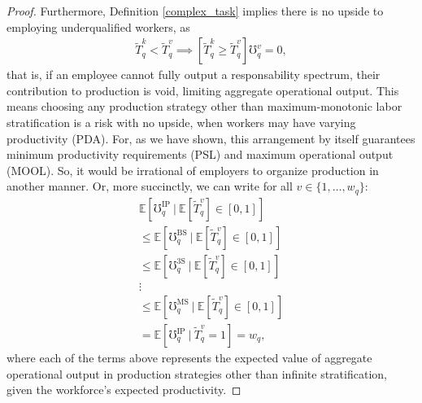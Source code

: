 \documentclass[hidelinks, nonatbib]{elsarticle}
\begin{document}
\begin{lemma}
\begin{proof}
        Furthermore, Definition \ref{complex_task} implies there is no upside to employing underqualified workers, as 
        \begin{gather}
            \tilde{T}_{q}^{k}
            <
            \tilde{T}_{q}^{v}
            \implies
            \left[
                \tilde{T}_{q}^{k}
                \geq
                \tilde{T}_{q}^{v}
            \right]
            \mho_{q}^{v}
            =
            0
            ,
        \end{gather}
        that is, if an employee cannot fully output a responsability spectrum, their contribution to production is void, limiting aggregate operational output. This means choosing any production strategy other than maximum-monotonic labor stratification is a risk with no upside, when workers may have varying productivity (PDA). For, as we have shown, this arrangement by itself guarantees minimum productivity requirements (PSL) and maximum operational output (MOOL). So, it would be irrational of employers to organize production in another manner. Or, more succinctly, we can write for all $v \in \{1, \dots, w_q\}$:
        \begin{gather}
            \mathbb{E}[
                \mho_{q}^{\text{IP}}
                \
                |
                \
                \mathbb{E}[
                    \tilde{T}_{q}^{v}
                ]
                \in [0,1]
            ]
            \\
            \leq
            \mathbb{E}[
                \mho_{q}^{\text{BS}}
                \
                |
                \
                \mathbb{E}[
                    \tilde{T}_{q}^{v}
                ]
                \in [0,1]
            ]
            \\
            \leq
            \mathbb{E}[
                \mho_{q}^{\text{3S}}
                \
                |
                \
                \mathbb{E}[
                    \tilde{T}_{q}^{v}
                ]
                \in [0,1]
            ]
            \\
            \vdots
            \\
            \leq
            \mathbb{E}[
                \mho_{q}^{\text{MS}}
                \
                |
                \
                \mathbb{E}[
                    \tilde{T}_{q}^{v}
                ]
                \in [0,1]
            ]
            \\
            =
            \mathbb{E}[
                \mho_{q}^{\text{IP}}
                \
                |
                \
                \tilde{T}_{q}^{v}
                = 1
            ]
            =
            w_q
            ,
        \end{gather}
        where each of the terms above represents the expected value of aggregate operational output in production strategies other than infinite stratification, given the workforce's expected productivity.


\end{proof}
\end{lemma}
\end{document}
